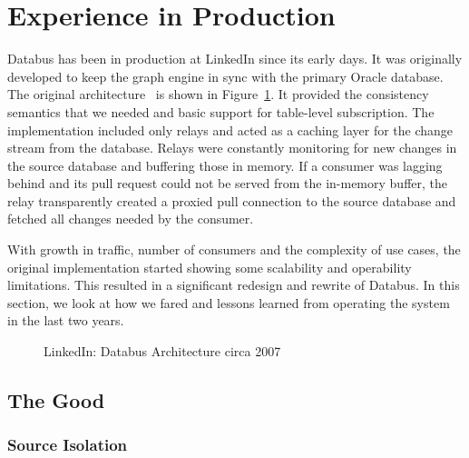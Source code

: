 \section{Experience in Production}
Databus has been in production at LinkedIn since its early days. It was originally developed to keep the graph engine in sync with the primary Oracle database.  
The original architecture~\cite{databus-qcon07} is shown in Figure~\ref{fig:databus-v1-arch}. It provided the consistency semantics that we needed and basic support for table-level subscription. The implementation included only relays and acted as a caching layer for the change stream from the database. Relays were constantly monitoring for new changes in the source database and buffering those in memory. If a consumer was lagging behind and its pull request could not be served from the in-memory buffer, the relay transparently created a proxied pull connection to the source database and fetched all changes needed by the consumer. 

With growth in traffic, number of consumers and the complexity of use cases, the original implementation started showing some scalability and operability limitations. This resulted in a significant redesign and rewrite of Databus. In this section, we look at how we fared and lessons learned from operating the system in the last two years. 

\begin{figure}
\centering
{}
\caption{LinkedIn: Databus Architecture circa 2007}
\label{fig:databus-v1-arch}
\end{figure}

\subsection{The Good}

\subsubsection{Source Isolation} 

